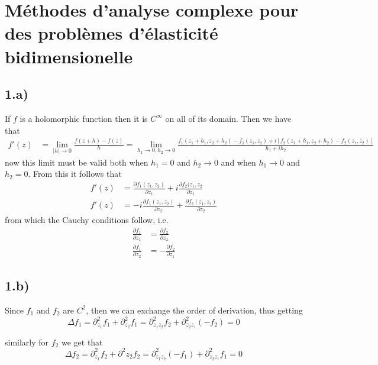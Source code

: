\documentclass[10pt,a4paper]{book}
\begin{document}
\section*{Méthodes d'analyse complexe pour des problèmes d'élasticité bidimensionelle}

\subsection*{1.a)}
If $f$ is a holomorphic function then it is $C^{\infty}$ on all of its domain. 
Then we have that 
\begin{align*}
f'(z)&=\lim_{|h|\to 0}\frac{f(z+h)-f(z)}{h}=\lim_{h_1\to 0,h_2\to 0}\frac{f_1(z_1+h_1,z_2+h_2)-f_1(z_1,z_2)+i[f_2(z_1+h_1,z_2+h_2)-f_2(z_1,z_2)]}{h_1+ih_2}
\end{align*}
now this limit must be valid both when $h_1=0$ and $h_2\to 0 $ and when $h_1\to 0$ and $h_2=0$. From this it follows that 
\begin{align*}
f'(z)&=\frac{\partial f_1(z_1,z_2)}{\partial z_1}+i\frac{\partial f_2(z_1,z_2}{\partial z_1}\\
f'(z)&=-i\frac{\partial f_1(z_1,z_2)}{\partial z_2}+\frac{\partial f_2(z_1,z_2)}{\partial z_2}
\end{align*} from which the Cauchy conditions follow, i.e.
\begin{align*}
\frac{\partial f_1}{\partial z_1}&=\frac{\partial f_2}{\partial z_2}\\
\frac{\partial f_1}{\partial z_2}&=-\frac{\partial f_2}{\partial z_1}
\end{align*}


\subsection*{1.b)}
Since $f_1$ and $f_2$ are $C^2$, then we can exchange the order of derivation, thus getting
$$\Delta f_1=\partial^2_{z_1}f_1+\partial^2_{z_2} f_1=\partial^2_{z_1z_2}f_2+\partial^2_{z_2z_1}(-f_2)=0$$

similarly for $f_2$ we get that 
$$\Delta f_2=\partial^2_{z_1}f_2+\partial^2{z_2}f_2=\partial^2_{z_1z_2}(-f_1)+\partial^2_{z_2z_1}f_1=0$$
\end{document}
